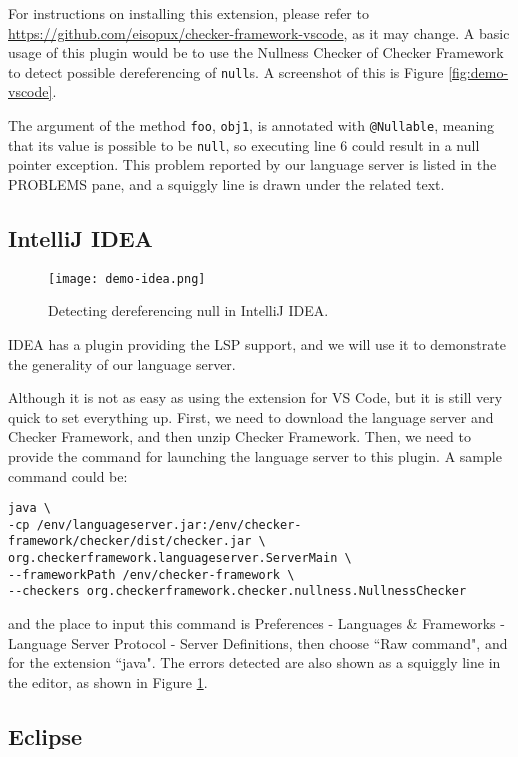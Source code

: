 \documentclass{article}
\begin{document}
For instructions on installing this extension, please refer to
\url{https://github.com/eisopux/checker-framework-vscode}, as it may change. A
basic usage of this plugin would be to use the Nullness Checker of Checker
Framework to detect possible dereferencing of \verb|null|s. A screenshot of this
is Figure \ref{fig:demo-vscode}.

The argument of the method \verb|foo|, \verb|obj1|, is annotated with
\verb|@Nullable|, meaning that its value is possible to be \verb|null|, so
executing line 6 could result in a null pointer exception. This problem reported
by our language server is listed in the PROBLEMS pane, and a squiggly line is
drawn under the related text.


\subsection{IntelliJ IDEA}

\begin{figure}[ht]
\centering
\texttt{[image: demo-idea.png]}
\caption{Detecting dereferencing null in IntelliJ IDEA.}
\label{fig:demo-idea}
\end{figure}

IDEA has a plugin providing the LSP support\cite{idealsp}, and we will use it to
demonstrate the generality of our language server.

Although it is not as easy as using the extension for VS Code, but it is still
very quick to set everything up. First, we need to download the language server
and Checker Framework, and then unzip Checker Framework. Then, we need to
provide the command for launching the language server to this plugin. A sample
command could be:

\begin{lstlisting}
java \
-cp /env/languageserver.jar:/env/checker-framework/checker/dist/checker.jar \
org.checkerframework.languageserver.ServerMain \
--frameworkPath /env/checker-framework \
--checkers org.checkerframework.checker.nullness.NullnessChecker
\end{lstlisting}

and the place to input this command is Preferences - Languages \& Frameworks -
Language Server Protocol - Server Definitions, then choose ``Raw command", and
for the extension ``java". The errors detected are also shown as a squiggly line
in the editor, as shown in Figure \ref{fig:demo-idea}.


\subsection{Eclipse}
\end{document}
